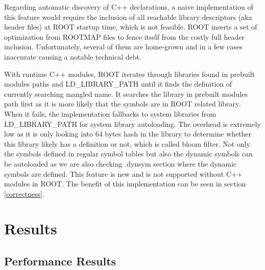 \documentclass{webofc}
\begin{document}
Regarding automatic discovery of C++ declarations, a naive implementation of this feature would require the inclusion of all reachable library descriptors (aka header files) at ROOT startup time, which is not feasible. ROOT inserts a set of optimization from ROOTMAP files to fence itself from the costly full header inclusion. Unfortunately, several of them are home-grown and in a few cases inaccurate causing a notable technical debt.

With runtime C++ modules, ROOT iterates through libraries found in prebuilt modules paths and LD\_LIBRARY\_PATH until it finds the definition of currently searching mangled name. It searches the library in prebuilt modules path first as it is more likely that the symbols are in ROOT related library. When it fails, the implementation fallbacks to system libraries from LD\_LIBRARY\_PATH for system library autoloading. The overhead is extremely low as it is only looking into 64 bytes hash in the library to determine whether this library likely has a definition or not, which is called bloom filter. Not only the symbols defined in regular symbol tables but also the dynamic symbols can be autoloaded as we are also checking .dynsym section where the dynamic symbols are defined. This feature is new and is not supported without C++ modules in ROOT. The benefit of this implementation can be seen in section \ref{correctness}.

\section{Results}
\label{results}

\subsection{Performance Results}
\label{performance}
\end{document}
